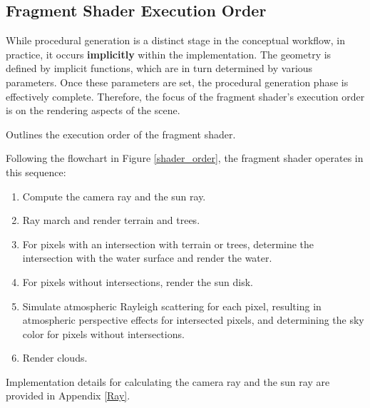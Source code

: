 
\subsection{Fragment Shader Execution Order}
\label{Fragment Shader Execution Order}

While procedural generation is a distinct stage in the conceptual workflow, in practice, it occurs \textbf{implicitly} within the implementation. The geometry is defined by implicit functions, which are in turn determined by various parameters. Once these parameters are set, the procedural generation phase is effectively complete. Therefore, the focus of the fragment shader’s execution order is on the rendering aspects of the scene.

\vspace{\baselineskip}

{Outlines the execution order of the fragment shader.}{
Following the flowchart in Figure \ref{shader_order}, the fragment shader operates in this sequence:
\begin{enumerate}
    \item Compute the camera ray and the sun ray.
    \item Ray march and render terrain and trees.
    \item For pixels with an intersection with terrain or trees, determine the intersection with the water surface and render the water.
    \item For pixels without intersections, render the sun disk.
    \item Simulate atmospheric Rayleigh scattering for each pixel, resulting in atmospheric perspective effects for intersected pixels, and determining the sky color for pixels without intersections.
    \item Render clouds.
\end{enumerate}
}


\vspace{\baselineskip}

Implementation details for calculating the camera ray and the sun ray are provided in Appendix \ref{Ray}.


